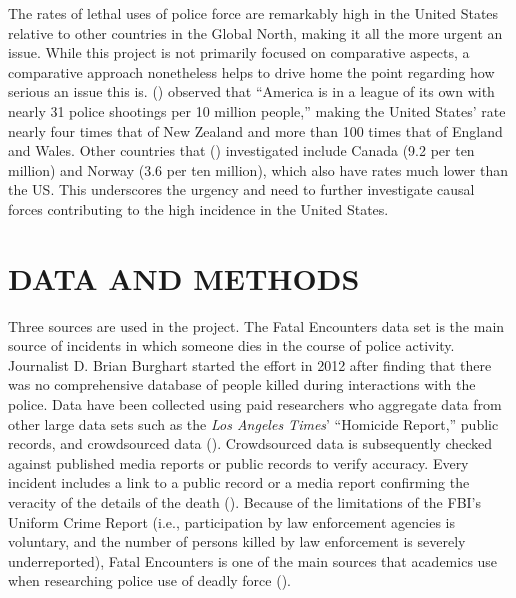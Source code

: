 \documentclass[12pt]{article}
\begin{document}
The rates of lethal uses of police force are remarkably high in the United States relative to other countries in the Global North, making it all the more urgent an issue. While this project is not primarily focused on comparative aspects, a comparative approach nonetheless helps to drive home the point regarding how serious an issue this is. \citeauthor{espinerLicenceKillStartling2022} (\citeyear{espinerLicenceKillStartling2022}) observed that “America is in a league of its own with nearly 31 police shootings per 10 million people,” making the United States' rate nearly four times that of New Zealand and more than 100 times that of England and Wales. Other countries that \citeauthor{espinerLicenceKillStartling2022} (\citeyear{espinerLicenceKillStartling2022}) investigated include Canada (9.2 per ten million) and Norway (3.6 per ten million), which also have rates much lower than the US. This underscores the urgency and need to further investigate causal forces contributing to the high incidence in the United States.

\section{DATA AND METHODS}

Three sources are used in the project. The Fatal Encounters data set is the main source of incidents in which someone dies in the course of police activity. Journalist D. Brian Burghart started the effort in 2012 after finding that there was no comprehensive database of people killed during interactions with the police. Data have been collected using paid researchers who aggregate data from other large data sets such as the \textit{Los Angeles Times}’ “Homicide Report,” public records, and crowdsourced data (\cite{burghartMeFatalEncounters}). Crowdsourced data is subsequently checked against published media reports or public records to verify accuracy. Every incident includes a link to a public record or a media report confirming the veracity of the details of the death (\cite{burghartMeFatalEncounters}). Because of the limitations of the FBI’s Uniform Crime Report (i.e., participation by law enforcement agencies is voluntary, and the number of persons killed by law enforcement is severely underreported), Fatal Encounters is one of the main sources that academics use when researching police use of deadly force (\cite{feldmanKilledPoliceValidity2017, feldmanQuantifyingUnderreportingLawenforcementrelated2017, feldmanPoliceRelatedDeathsNeighborhood2019}).
\end{document}

